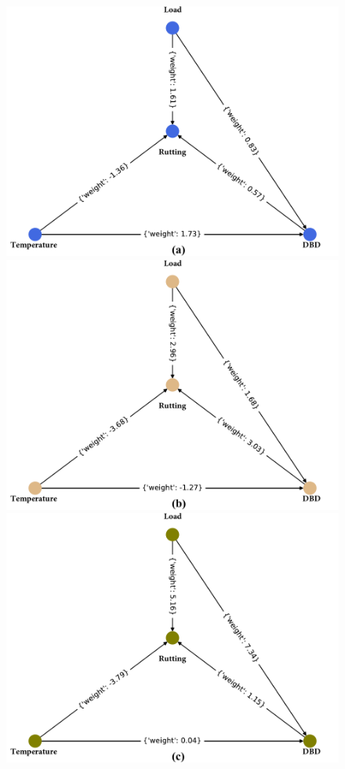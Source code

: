\begin{figure}[tbp]
\begin{center}
\includegraphics[scale=0.3]{./ch2/fig2_16.pdf}
\includegraphics[scale=0.3]{./ch2/fig2_17.pdf}
\includegraphics[scale=0.3]{./ch2/fig2_18.pdf}\\

\end{center}
\end{figure}
